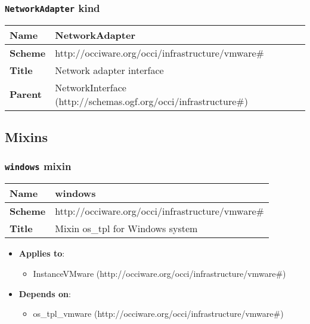 \subsubsection{\texttt{NetworkAdapter} kind}
\begin{center}
\begin{tabular}{|l|l|}
  \hline
  \textbf{Name} & NetworkAdapter \\
  \hline  
  \textbf{Scheme} & http://occiware.org/occi/infrastructure/vmware\# \\
  \hline
  \textbf{Title} & Network adapter interface \\
  \hline
  \textbf{Parent} & NetworkInterface (http://schemas.ogf.org/occi/infrastructure\#) \\
  \hline
\end{tabular}
\end{center}



\subsection{Mixins}
\subsubsection{\texttt{windows} mixin}
\begin{center}
\begin{tabular}{|l|l|}
  \hline
  \textbf{Name} & windows \\
  \hline  
  \textbf{Scheme} & http://occiware.org/occi/infrastructure/vmware\# \\
  \hline
  \textbf{Title} & Mixin os\_tpl for Windows system \\
  \hline
\end{tabular}
\end{center}
\begin{itemize}
\item \textbf{Applies to}:
\begin{itemize}
	\item InstanceVMware (http://occiware.org/occi/infrastructure/vmware\#)
\end{itemize}
\end{itemize} 
\begin{itemize}
\item \textbf{Depends on}:
\begin{itemize}
	\item os\_tpl_vmware (http://occiware.org/occi/infrastructure/vmware\#)
\end{itemize}
\end{itemize}



